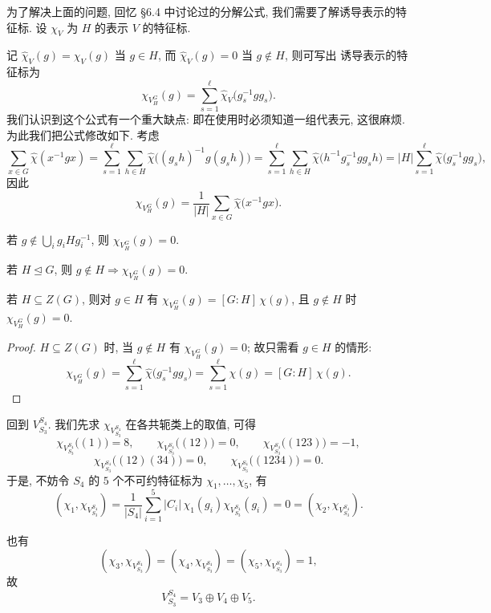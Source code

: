 为了解决上面的问题, 回忆 \S 6.4 中讨论过的分解公式, 我们需要了解诱导表示的特征标.
设 $\chi_V$ 为 $H$ 的表示 $V$ 的特征标.

记 $\widehat\chi_V(g)=\chi_V(g)$ 当 $g\in H$, 而 $\widehat\chi_V(g)=0$ 当 $g\notin H$, 则可写出
诱导表示的特征标为
\[
  \chi_{V_H^G}(g)=\sum_{s=1}^{\ell}\widehat\chi_V\bigl(g_s^{-1}gg_s\bigr).
\]
我们认识到这个公式有一个重大缺点: 即在使用时必须知道一组代表元, 这很麻烦.
为此我们把公式修改如下. 考虑
\[
  \sum_{x\in G}\widehat\chi(x^{-1}gx)
  =\sum_{s=1}^{\ell}\sum_{h\in H}\widehat\chi\bigl((g_sh)^{-1}g(g_sh)\bigr)
  =\sum_{s=1}^{\ell}\sum_{h\in H}\widehat\chi\bigl(h^{-1}g_s^{-1}gg_sh\bigr)
  =|H|\sum_{s=1}^{\ell}\widehat\chi\bigl(g_s^{-1}gg_s\bigr),
\]
因此
\begin{equation}\label{eq:induced-character}
  \chi_{V_H^G}(g)=\frac{1}{|H|}\sum_{x\in G}\widehat\chi\bigl(x^{-1}gx\bigr).
\end{equation}

\begin{proposition}\label{prop:induced-character-zero}
若 $g\notin\bigcup_{i}g_iHg_i^{-1}$, 则 $\chi_{V_H^G}(g)=0$.
\end{proposition}

\begin{corollary}\label{cor:induced-normal}
若 $H\trianglelefteq G$, 则 $g\notin H\Rightarrow\chi_{V_H^G}(g)=0$.
\end{corollary}

\begin{corollary}\label{cor:induced-central}
若 $H\subseteq Z(G)$, 则对 $g\in H$ 有 $\chi_{V_H^G}(g)=[G:H]\,\chi(g)$, 且 $g\notin H$ 时 $\chi_{V_H^G}(g)=0$.
\end{corollary}

\begin{proof}
$H\subseteq Z(G)$ 时, 当 $g\notin H$ 有 $\chi_{V_H^G}(g)=0$; 故只需看 $g\in H$ 的情形:
\[
  \chi_{V_H^G}(g)=\sum_{s=1}^{\ell}\widehat\chi\bigl(g_s^{-1}gg_s\bigr)
  =\sum_{s=1}^{\ell}\chi(g)=[G:H]\,\chi(g).
\]
\end{proof}

\begin{example}\label{ex:S3-in-S4-character}
回到 $V_{S_3}^{S_4}$. 我们先求 $\chi_{V_{S_3}^{S_4}}$ 在各共轭类上的取值, 可得
\[
  \chi_{V_{S_3}^{S_4}}\bigl((1)\bigr)=8,\qquad
  \chi_{V_{S_3}^{S_4}}\bigl((12)\bigr)=0,\qquad
  \chi_{V_{S_3}^{S_4}}\bigl((123)\bigr)=-1,
\]
\[
  \chi_{V_{S_3}^{S_4}}\bigl((12)(34)\bigr)=0,\qquad
  \chi_{V_{S_3}^{S_4}}\bigl((1234)\bigr)=0 .
\]
于是, 不妨令 $S_4$ 的 $5$ 个不可约特征标为 $\chi_1,\dots,\chi_5$, 有
\[
  (\chi_1,\chi_{V_{S_3}^{S_4}})=\frac{1}{|S_4|}\sum_{i=1}^{5}|C_i|\,\chi_1(g_i)\chi_{V_{S_3}^{S_4}}(g_i)=0
  =(\chi_2,\chi_{V_{S_3}^{S_4}}).
\]

也有
\[
  (\chi_3,\chi_{V_{S_3}^{S_4}})=(\chi_4,\chi_{V_{S_3}^{S_4}})=(\chi_5,\chi_{V_{S_3}^{S_4}})=1,
\]
故
\[
  V_{S_3}^{S_4}=V_3\oplus V_4\oplus V_5 .
\]
\end{example}

